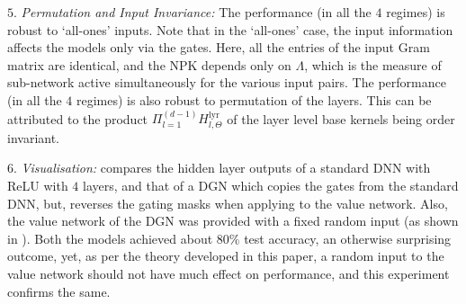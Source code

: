 \indent\quad $5.$ \emph{Permutation and Input Invariance:} The performance (in all the $4$ regimes) is  robust to `all-ones' inputs. Note that in the `all-ones' case, the input information affects the models only via the gates. Here, all the entries of the input Gram matrix are identical, and the NPK depends only on $\Lambda$, which is the measure of sub-network active simultaneously for the various input pairs. The performance (in all the $4$ regimes) is also robust to permutation of the layers. This can be attributed to the product $\Pi_{l=1}^{(d-1)} H^{\text{lyr}}_{l,\Theta}$ of the layer level base kernels being order invariant.

\indent\quad $6.$ \emph{Visualisation:}  compares the hidden layer outputs of a standard DNN with ReLU with $4$ layers, and that of a DGN which copies the gates from the standard DNN, but, reverses the gating masks when applying to the value network. Also, the value network of the DGN was provided with a fixed random input (as shown in ). Both the models achieved about $80\%$ test accuracy, an otherwise surprising outcome, yet, as per the theory developed in this paper, a random input to the value network should not have much effect on performance, and this experiment confirms the same.

